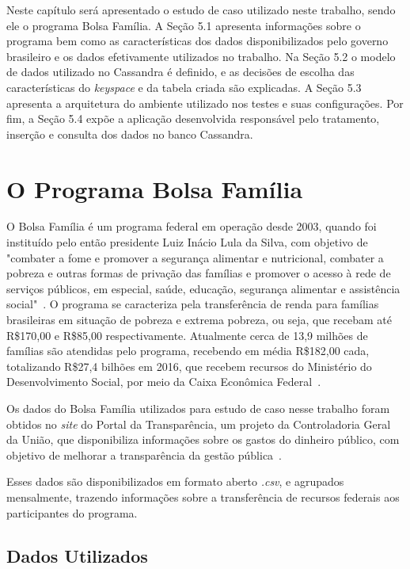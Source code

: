 Neste capítulo será apresentado o estudo de caso utilizado neste trabalho, sendo ele o programa Bolsa Família. A Seção 5.1 apresenta informações sobre o programa bem como as características dos dados disponibilizados pelo governo brasileiro e os dados efetivamente utilizados no trabalho. Na Seção 5.2 o modelo de dados utilizado no Cassandra é definido, e as decisões de escolha das características do \emph{keyspace} e da tabela criada são explicadas. A Seção 5.3 apresenta a arquitetura do ambiente utilizado nos testes e suas configurações. Por fim, a Seção 5.4 expõe a aplicação desenvolvida responsável pelo tratamento, inserção e consulta dos dados no banco Cassandra.

\section{O Programa Bolsa Família}
O Bolsa Família é um programa federal em operação desde 2003, quando foi instituído pelo então presidente Luiz Inácio Lula da Silva, com objetivo de "combater a fome e promover a segurança alimentar e nutricional, combater a pobreza e outras formas de privação das famílias e promover o acesso à rede de serviços públicos, em especial, saúde, educação, segurança alimentar e assistência social"~\cite{caixa-bolsafamilia}. 
O programa se caracteriza pela transferência de renda para famílias brasileiras em situação de pobreza e extrema pobreza, ou seja, que recebam até R\$170,00 e R\$85,00 respectivamente. Atualmente cerca de 13,9 milhões de famílias são atendidas pelo programa, recebendo em média R\$182,00 cada, totalizando R\$27,4 bilhões em 2016, que recebem recursos do Ministério do Desenvolvimento Social, por meio da Caixa Econômica Federal~\cite{gov-bolsafamilia1, gov-bolsafamilia2}.

Os dados do Bolsa Família utilizados para estudo de caso nesse trabalho foram obtidos no \emph{site} do Portal da Transparência, um projeto da Controladoria Geral da União, que disponibiliza informações sobre os gastos do dinheiro público, com objetivo de melhorar a transparência da gestão pública~\cite{sobreportaldatransparencia}. 

Esses dados são disponibilizados em formato aberto \emph{.csv}, e agrupados mensalmente, trazendo informações sobre a transferência de recursos federais aos participantes do programa. 

\subsection{Dados Utilizados}

